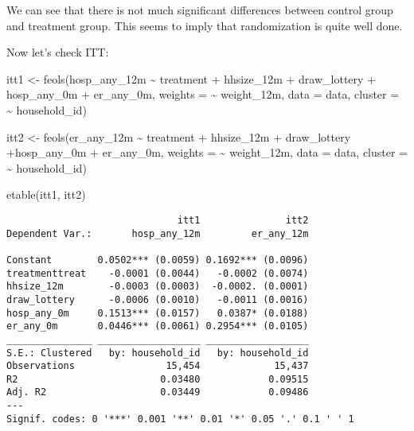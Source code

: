 \documentclass[
  letterpaper,
  DIV=11,
  numbers=noendperiod]{scrartcl}
\newenvironment{Shaded}{\begin{snugshade}}{\end{snugshade}}
\newcommand{\AttributeTok}[1]{\textcolor[rgb]{0.40,0.45,0.13}{#1}}
\newcommand{\FunctionTok}[1]{\textcolor[rgb]{0.28,0.35,0.67}{#1}}
\newcommand{\NormalTok}[1]{\textcolor[rgb]{0.00,0.23,0.31}{#1}}
\newcommand{\OtherTok}[1]{\textcolor[rgb]{0.00,0.23,0.31}{#1}}
\newcommand{\SpecialCharTok}[1]{\textcolor[rgb]{0.37,0.37,0.37}{#1}}
\begin{document}
We can see that there is not much significant differences between
control group and treatment group. This seems to imply that
randomization is quite well done.

Now let's check ITT:

\begin{Shaded}
\begin{Highlighting}[]
\NormalTok{itt1 }\OtherTok{\textless{}{-}} \FunctionTok{feols}\NormalTok{(hosp\_any\_12m }\SpecialCharTok{\textasciitilde{}}\NormalTok{ treatment }\SpecialCharTok{+}\NormalTok{ hhsize\_12m }\SpecialCharTok{+}\NormalTok{ draw\_lottery }\SpecialCharTok{+}\NormalTok{ hosp\_any\_0m }\SpecialCharTok{+}\NormalTok{ er\_any\_0m, }\AttributeTok{weights =} \SpecialCharTok{\textasciitilde{}}\NormalTok{ weight\_12m, }\AttributeTok{data =}\NormalTok{ data, }\AttributeTok{cluster =} \SpecialCharTok{\textasciitilde{}}\NormalTok{ household\_id)}

\NormalTok{itt2 }\OtherTok{\textless{}{-}} \FunctionTok{feols}\NormalTok{(er\_any\_12m }\SpecialCharTok{\textasciitilde{}}\NormalTok{ treatment }\SpecialCharTok{+}\NormalTok{ hhsize\_12m }\SpecialCharTok{+}\NormalTok{ draw\_lottery }\SpecialCharTok{+}\NormalTok{hosp\_any\_0m }\SpecialCharTok{+}\NormalTok{ er\_any\_0m, }\AttributeTok{weights =} \SpecialCharTok{\textasciitilde{}}\NormalTok{ weight\_12m, }\AttributeTok{data =}\NormalTok{ data, }\AttributeTok{cluster =} \SpecialCharTok{\textasciitilde{}}\NormalTok{ household\_id)}

\FunctionTok{etable}\NormalTok{(itt1, itt2)}
\end{Highlighting}
\end{Shaded}

\begin{verbatim}
                              itt1               itt2
Dependent Var.:       hosp_any_12m         er_any_12m
                                                     
Constant        0.0502*** (0.0059) 0.1692*** (0.0096)
treatmenttreat    -0.0001 (0.0044)   -0.0002 (0.0074)
hhsize_12m        -0.0003 (0.0003)  -0.0002. (0.0001)
draw_lottery      -0.0006 (0.0010)   -0.0011 (0.0016)
hosp_any_0m     0.1513*** (0.0157)   0.0387* (0.0188)
er_any_0m       0.0446*** (0.0061) 0.2954*** (0.0105)
_______________ __________________ __________________
S.E.: Clustered   by: household_id   by: household_id
Observations                15,454             15,437
R2                         0.03480            0.09515
Adj. R2                    0.03449            0.09486
---
Signif. codes: 0 '***' 0.001 '**' 0.01 '*' 0.05 '.' 0.1 ' ' 1
\end{verbatim}
\end{document}
